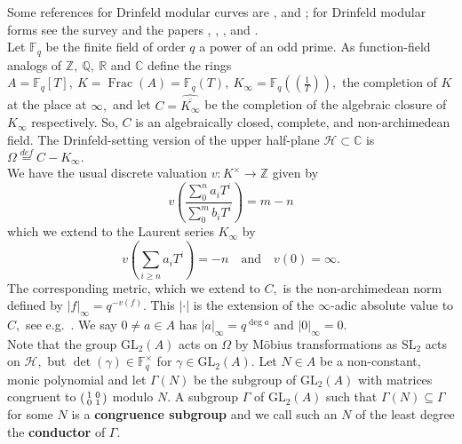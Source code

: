 \documentclass[11pt]{amsart}
\theoremstyle{definition}
\newenvironment{psmallmatrix}
{\left(\begin{smallmatrix}}
	{\end{smallmatrix}\right)}
\numberwithin{equation}{section}
\newcommand{\GL}{\mathrm{GL}} 	%
\newcommand{\SL}{\mathrm{SL}} 	%
\newcommand{\cH}{\mathcal{H}}		%
\newcommand{\bbC}{\mathbb{C}}		%
\newcommand{\bbF}{\mathbb{F}}		%
\newcommand{\bbQ}{\mathbb{Q}}		%
\newcommand{\bbR}{\mathbb{R}}		%
\newcommand{\bbZ}{\mathbb{Z}}		%
\begin{document}
		Some references for Drinfeld modular curves are \cite{Gekeler-Curves}, \cite{Gekeler-Invariants} and \cite{Mason-Schweizer-elliptic-pts-Drinfeld-modular-grps}; for Drinfeld modular forms see the survey \cite{Gekeler-survey-Drinfeld-modular-forms} and the papers \cite{Gekeler-jacobians}, \cite{Gekeler-Coeff}, \cite{Breuer-Gekeler-h-function}, \cite{Cornelissen-lvlT} and \cite{Dalal-Kumar-Gamma_0(T)-structure}.\\
		
		Let $\bbF_q$ be the finite field of order $q$ a power of an odd prime. As function-field analogs of $\bbZ,~\bbQ,~\bbR$ and $\bbC$ define the rings $\displaystyle{A=\bbF_q[T], ~K=\operatorname{Frac}(A)=\bbF_q(T), ~K_{\infty}=\bbF_q\left(\!\left(\frac{1}{T}\right)\!\right)},$ the completion of $K$ at the place at $\infty,$ and let $C=\widehat{\overline{K_{\infty}}}$ be the completion of the algebraic closure of $K_{\infty}$ respectively. So, $C$ is an algebraically closed, complete, and non-archimedean field. The Drinfeld-setting version of the upper half-plane $\cH\subset \bbC$ is $\Omega\overset{def}{=}C-K_{\infty}.$ \\
		
		We have the usual discrete valuation $v: K^{\times}\to \bbZ$ given by 
		\[v\left(\frac{\sum_0^n a_iT^i}{\sum_0^m b_iT^i}\right)=m-n\] which we extend to the Laurent series $K_{\infty}$ by 
		\[v\left(\sum_{i\geq n}a_iT^i\right)=-n\quad\text{and}\quad v(0)=\infty.\] The corresponding metric, which we extend to $C,$ is the non-archimedean norm defined by $|f|_{\infty}=q^{-v(f)}.$ This $|\cdot|$ is the extension of the $\infty$-adic absolute value to $C,$ see e.g.\ \cite[Section $(2.2)$]{Poonen-DrinfeldIntro}. We say $0\neq a\in A$ has $|a|_{\infty}=q^{\deg a}$ and $|0|_{\infty}=0.$ \\
		
		
		Note that the group $\GL_2(A)$ acts on $\Omega$ by M\"obius transformations as $\SL_2$ acts on $\cH,$ but $\det(\gamma)\in \bbF_q^{\times}$ for $\gamma\in \GL_2(A).$ Let $N\in A$ be a non-constant, monic polynomial and let $\Gamma(N)$ be the subgroup of $\GL_2(A)$ with matrices congruent to $\begin{psmallmatrix}1&0\\0&1\end{psmallmatrix}$ modulo $N.$ A subgroup $\Gamma$ of $\GL_2(A)$ such that $\Gamma(N)\subseteq \Gamma$ for some $N$ is a \textbf{congruence subgroup} and we call such an $N$ of the least degree the \textbf{conductor} of $\Gamma.$ \\
		
\end{document}
